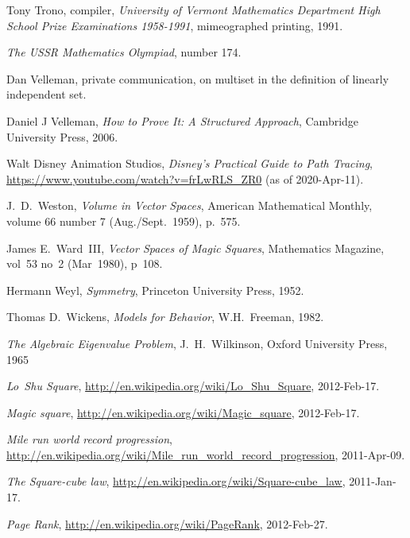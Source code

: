 \begin{thebibliography}{\makebox[2em][c]{{}\hfil{}}}
  Tony Trono, compiler,
  \emph{University of Vermont Mathematics Department High School Prize
    Examinations 1958-1991},
  mimeographed printing, 1991.

  \emph{The USSR Mathematics Olympiad},
   number 174.

  Dan Velleman,
  private communication, on multiset in the definition of
  linearly independent set.

  Daniel J Velleman,
  \textit{How to Prove It: A Structured Approach},
  Cambridge University Press,
  2006.

  Walt Disney Animation Studios,
  \emph{Disney's Practical Guide to Path Tracing},
  \url{https://www.youtube.com/watch?v=frLwRLS_ZR0}
  (as of 2020-Apr-11).

  J.~D.\ Weston,
  \emph{Volume in Vector Spaces},
  American Mathematical Monthly,
  volume 66 number 7 (Aug./Sept.\ 1959),
  p.~575.

  James E.\ Ward~III,
  \emph{Vector Spaces of Magic Squares},
  Mathematics Magazine,
  vol~53 no~2 (Mar~1980),
  p~108.

  Hermann Weyl,
  \emph{Symmetry},
  Princeton University Press,
  1952.

  Thomas D.~Wickens,
  \emph{Models for Behavior},
  W.H.~Freeman,
  1982.

  \emph{The Algebraic Eigenvalue Problem},
  J.~H.~Wilkinson,
  Oxford University Press,
  1965

  \emph{Lo~Shu Square},
  \url{http://en.wikipedia.org/wiki/Lo_Shu_Square},
  2012-Feb-17.

  \emph{Magic square},
  \url{http://en.wikipedia.org/wiki/Magic_square},
  2012-Feb-17.

  \emph{Mile run world record progression},
  \url{http://en.wikipedia.org/wiki/Mile_run_world_record_progression},
  2011-Apr-09.

  \emph{The Square-cube law},
  \url{http://en.wikipedia.org/wiki/Square-cube_law},
  2011-Jan-17.

  \emph{Page Rank},
  \url{http://en.wikipedia.org/wiki/PageRank},
  2012-Feb-27.


\end{thebibliography}
